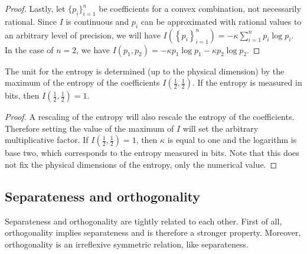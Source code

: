 \begin{mathSection}
\begin{proof}
	Lastly, let $\{p_i\}_{i=1}^{n}$ be coefficients for a convex combination, not necessarily rational. Since $I$ is continuous and $p_i$ can be approximated with rational values to an arbitrary level of precision, we will have $I\left(\left\{ p_i\right\}_{i=1}^{n}\right) = - \kappa \sum_{i=1}^{n} p_i \log p_i$. In the case of $n=2$, we have $I(p_1, p_2) = - \kappa p_1 \log p_1 - \kappa p_2 \log p_2$.	
\end{proof}

\begin{coro}
	The unit for the entropy is determined (up to the physical dimension) by the maximum of the entropy of the coefficients $I\left(\frac{1}{2}, \frac{1}{2}\right)$. If the entropy is measured in bits, then $I\left(\frac{1}{2}, \frac{1}{2}\right) = 1$.
\end{coro}

\begin{proof}
	A rescaling of the entropy will also rescale the entropy of the coefficients. Therefore setting the value of the maximum of $I$ will set the arbitrary multiplicative factor. If $I\left(\frac{1}{2}, \frac{1}{2}\right) = 1$, then $\kappa$ is equal to one and the logarithm is base two, which corresponds to the entropy measured in bits. Note that this does not fix the physical dimensions of the entropy, only the numerical value.
\end{proof}
\end{mathSection}

\subsection{Separateness and orthogonality}

Separateness and orthogonality are tightly related to each other. First of all, orthogonality implies separateness and is therefore a stronger property. Moreover, orthogonality is an irreflexive symmetric relation, like separateness.

